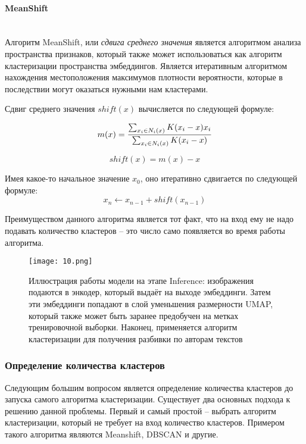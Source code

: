 \paragraph{MeanShift}\mbox{} \\

Алгоритм MeanShift, или \textit{сдвига среднего значения} является алгоритмом анализа пространства признаков, который также может использоваться как алгоритм кластеризации пространства эмбеддингов. Является итеративным алгоритмом нахождения местоположения максимумов плотности вероятности, которые в последствии могут оказаться нужными нам кластерами. 

Сдвиг среднего значения $shift(x)$ вычисляется по следующей формуле:

$$
m(x) = \frac{\sum_{x_i \in N_i(x)} K(x_i - x)x_i}{\sum_{x_i \in N_i(x)} K(x_i - x)}\\
$$

$$
shift(x) = m(x) - x
$$

\noindent
Имея какое-то начальное значение $x_0$, оно итеративно сдвигается по следующей формуле:
$$
x_n \leftarrow x_{n - 1} + shift(x_{n - 1})
$$

Преимуществом данного алгоритма является тот факт, что на вход ему не надо подавать количество кластеров -- это число само появляется во время работы алгоритма.

\begin{figure}[htbp]
    \centering
    \texttt{[image: 10.png]}
    \captionsetup{width=0.9\textwidth}
    \caption{Иллюстрация работы модели на этапе Inference: изображения подаются в энкодер, который выдаёт на выходе эмбеддинги. Затем эти эмбеддинги попадают в слой уменьшения размерности UMAP, который также может быть заранее предобучен на метках тренировочной выборки. Наконец, применяется алгоритм кластеризации для получения разбивки по авторам текстов}
    \label{fig:example}
\end{figure}

\subsubsection{Определение количества кластеров}

Следующим большим вопросом является определение количества кластеров до запуска самого алгоритма кластеризации. Существует два основных подхода к решению данной проблемы. Первый и самый простой -- выбрать алгоритм кластеризации, который не требует на вход количество кластеров. Примером такого алгоритма являются Meanshift, DBSCAN и другие.

